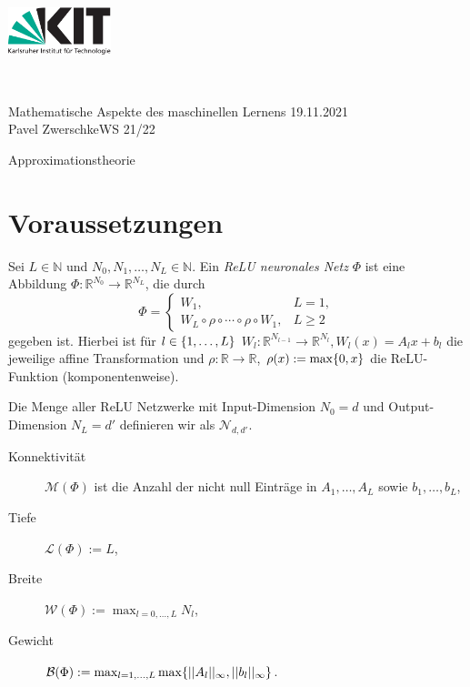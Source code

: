 \documentclass[11pt]{scrartcl}
\def\Semester{WS 21/22}
\def\Seminar{Mathematische Aspekte des maschinellen Lernens}
\def\Title{Approximationstheorie}
\def\Author{Pavel Zwerschke}
\def\Date{19.11.2021} %
\newcommand{\N}{\mathbb{N}} %
\newcommand{\R}{\mathbb{R}} %
\begin{document}
\vspace*{-2cm}
\begin{minipage}{3cm}
    \includegraphics[width=3cm]{./logos/kit-de.pdf} %
\end{minipage}\hspace*{0.2cm}~
\begin{minipage}{14cm}{
        \sffamily \Large{\Seminar} \hfill \Date \\ 
        \Author \hfill \Semester
}\end{minipage}
\vspace{-0.5cm}
\begin{center}
    \huge \sffamily \Title
\end{center}
\vspace{-1cm}

\section{Voraussetzungen}
\label{sec:prerequisites}

\begin{definition}
    Sei \(L \in \N\) und \(N_0, N_1, \ldots, N_L \in \N\). Ein 
    \textit{ReLU neuronales Netz} \(\Phi\) ist eine Abbildung 
    \(\Phi: \R^{N_0} \rightarrow \R^{N_L}\), die durch 
    \[ \Phi = \begin{cases}
        W_1, & L = 1, \\
        W_L \circ \rho \circ \cdots \circ \rho \circ W_1, & L \geq 2
    \end{cases} \]
    gegeben ist. Hierbei ist für \(l\in \{1,\ldots, L\}\) \(W_l : \R^{N_{l-1}} \rightarrow \R^{N_l}, W_l(x) = A_l x + b_l\) 
    die jeweilige affine Transformation und \(\rho: \R \rightarrow \R\), \(\rho(x) := \max\{0, x\}\) 
    die ReLU-Funktion (komponentenweise).

    Die Menge aller ReLU Netzwerke mit Input-Dimension \(N_0 = d\) und Output-Dimension \(N_L = d'\) 
    definieren wir als \(\mathcal{N}_{d,d'}\).
\end{definition}

\begin{definition}\leavevmode
    \begin{description}
        \item[Konnektivität] \(\mathcal{M}(\Phi)\) ist die Anzahl der nicht null Einträge in \(A_1, \ldots, A_L\) 
        sowie \(b_1, \ldots, b_L\),
        \item[Tiefe] \(\mathcal{L}(\Phi) := L\),
        \item[Breite] \(\mathcal{W}(\Phi) := \max_{l=0,\ldots, L} N_l\),
        \item[Gewicht] \(\mathcal{B}(\Phi) := \max_{l=1,\ldots, L} \max\{||A_l ||_\infty, ||b_l||_\infty\}\).
    \end{description}
\end{definition}
\end{document}
